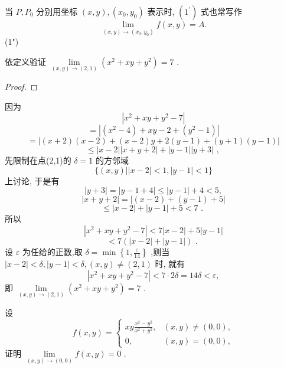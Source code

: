 当 \(P,{P}_{0}\) 分别用坐标 \(\left( {x,y}\right) ,\left( {{x}_{0},{y}_{0}}\right)\) 表示时, \(\left( {1}^{\prime }\right)\) 式也常写作
\[
\mathop{\lim }\limits_{{\left( {x,y}\right)  \rightarrow  \left( {{x}_{0},{y}_{0}}\right) }}f\left( {x,y}\right)  = A.
\]
 (1")

\begin{example}

\end{example}
依定义验证 \(\mathop{\lim }\limits_{{\left( {x,y}\right)  \rightarrow  \left( {2,1}\right) }}\left( {{x}^{2} + {xy} + {y}^{2}}\right)  = 7\) .

\begin{proof}

\end{proof}
因为
\[
\left| {{x}^{2} + {xy} + {y}^{2} - 7}\right|
\]
\[
= \left| {\left( {{x}^{2} - 4}\right)  + {xy} - 2 + \left( {{y}^{2} - 1}\right) }\right|
\]
\[
= \left| {\left( {x + 2}\right) \left( {x - 2}\right)  + \left( {x - 2}\right) y + 2\left( {y - 1}\right)  + \left( {y + 1}\right) \left( {y - 1}\right) }\right|
\]
\[
\leq  \left| {x - 2}\right| \left| {x + y + 2}\right|  + \left| {y - 1}\right| \left| {y + 3}\right| \text{ , }
\]
先限制在点(2,1)的 \(\delta  = 1\) 的方邻域
\[
\{ \left( {x,y}\right) \left| \right| x - 2\left| { < 1,}\right| y - 1 \mid   < 1\}
\]
上讨论, 于是有
\[
\left| {y + 3}\right|  = \left| {y - 1 + 4}\right|  \leq  \left| {y - 1}\right|  + 4 < 5,
\]
\[
\left| {x + y + 2}\right|  = \left| {\left( {x - 2}\right)  + \left( {y - 1}\right)  + 5}\right|
\]
\[
\leq  \left| {x - 2}\right|  + \left| {y - 1}\right|  + 5 < 7\text{ . }
\]
所以
\[
\left| {{x}^{2} + {xy} + {y}^{2} - 7}\right|  < 7\left| {x - 2}\right|  + 5\left| {y - 1}\right|
\]
\[
< 7\left( {\left| {x - 2}\right|  + \left| {y - 1}\right| }\right) \text{ . }
\]
设 \(\varepsilon\) 为任给的正数,取 \(\delta  = \min \left\{  {1,\frac{\varepsilon }{14}}\right\}\) ,则当 \(\left| {x - 2}\right|  < \delta ,\left| {y - 1}\right|  < \delta ,\left( {x,y}\right)  \neq  \left( {2,1}\right)\) 时, 就有
\[
\left| {{x}^{2} + {xy} + {y}^{2} - 7}\right|  < 7 \cdot  {2\delta } = {14\delta } < \varepsilon ,
\]
即 \(\mathop{\lim }\limits_{{\left( {x,y}\right)  \rightarrow  \left( {2,1}\right) }}\left( {{x}^{2} + {xy} + {y}^{2}}\right)  = 7\) .

\begin{example}

\end{example}
设
\[
f\left( {x,y}\right)  = \left\{  \begin{matrix} {xy}\frac{{x}^{2} - {y}^{2}}{{x}^{2} + {y}^{2}}, & \left( {x,y}\right)  \neq  \left( {0,0}\right) , \\  0, & \left( {x,y}\right)  = \left( {0,0}\right) , \end{matrix}\right.
\]
证明 \(\mathop{\lim }\limits_{{\left( {x,y}\right)  \rightarrow  \left( {0,0}\right) }}f\left( {x,y}\right)  = 0\) .

